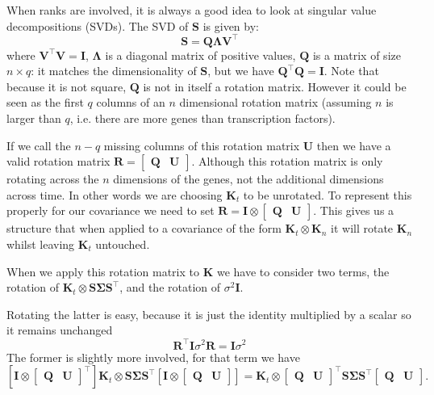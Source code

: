 When ranks are involved, it is always a good idea to look at singular value decompositions (SVDs). The SVD of 
$\mathbf{S}$ is given by:
\begin{equation} \label{eq:SVD}
\mathbf{S} = \mathbf{Q} \boldsymbol{\Lambda} \mathbf{V}^\top
\end{equation}
where $\mathbf{V}^\top \mathbf{V} = \mathbf{I}$, $\boldsymbol{\Lambda}$ is a diagonal matrix of positive values, 
$\mathbf{Q}$ is a matrix of size $n\times q$: it matches the dimensionality of $\mathbf{S}$, but we have 
$\mathbf{Q}^\top \mathbf{Q} = \mathbf{I}$. Note that because it is not square, $\mathbf{Q}$ is not in itself a 
rotation matrix. However it could be seen as the first $q$ columns of an $n$ dimensional rotation matrix 
(assuming $n$ is larger than $q$, i.e. there are more genes than transcription factors). 

If we call the $n-q$ missing columns of this rotation matrix $\mathbf{U}$ then we have a valid rotation matrix 
$\mathbf{R}=\begin{bmatrix} \mathbf{Q}& \mathbf{U}\end{bmatrix}$. Although this rotation matrix is only rotating 
across the $n$ dimensions of the genes, not the additional dimensions across time. In other words we are choosing 
$\mathbf{K}_t$ to be unrotated. To represent this properly for our covariance we need to set 
$\mathbf{R} = \mathbf{I} \otimes \begin{bmatrix} \mathbf{Q}& \mathbf{U}\end{bmatrix}$. This gives us a structure 
that when applied to a covariance of the form $\mathbf{K}_t\otimes \mathbf{K}_n$ it will rotate $\mathbf{K}_n$ 
whilst leaving $\mathbf{K}_t$ untouched.

When we apply this rotation matrix to $\mathbf{K}$ we have to consider two terms, 
the rotation of $\mathbf{K}_t \otimes \mathbf{S}\boldsymbol{\Sigma}\mathbf{S}^\top$, 
and the rotation of $\sigma^2 \mathbf{I}$.

Rotating the latter is easy, because it is just the identity multiplied by a scalar so it remains unchanged
\begin{equation} \label{eq:RotatingNoise}
\mathbf{R}^\top\mathbf{I}\sigma^2 \mathbf{R}= \mathbf{I}\sigma^2
\end{equation}
The former is slightly more involved, for that term we have
\begin{equation} \label{eq:svdONK}
\left[\mathbf{I}\otimes \begin{bmatrix}\mathbf{Q} & \mathbf{U}\end{bmatrix}^\top \right]\mathbf{K}_t \otimes 
\mathbf{S}\boldsymbol{\Sigma}\mathbf{S}^\top
\left[ \mathbf{I} \otimes \begin{bmatrix}\mathbf{Q} & \mathbf{U}\end{bmatrix}\right]
=
\mathbf{K}_t \otimes \begin{bmatrix}\mathbf{Q} & \mathbf{U}\end{bmatrix}^\top 
\mathbf{S} \boldsymbol{\Sigma}\mathbf{S}^\top \begin{bmatrix}\mathbf{Q} & \mathbf{U}\end{bmatrix}.
\end{equation}

